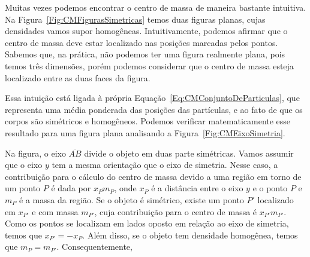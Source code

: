 Muitas vezes podemos encontrar o centro de massa de maneira bastante intuitiva. Na Figura~\ref{Fig:CMFigurasSimetricas} temos duas figuras planas, cujas densidades vamos supor homogêneas. Intuitivamente, podemos afirmar que o centro de massa deve estar localizado nas posições marcadas pelos pontos. Sabemos que, na prática, não podemos ter uma figura realmente plana, pois temos três dimensões, porém podemos considerar que o centro de massa esteja localizado entre as duas faces da figura.

Essa intuição está ligada à própria Equação~\eqref{Eq:CMConjuntoDeParticulas}, que representa uma média ponderada das posições das partículas, e ao fato de que os corpos são simétricos e homogêneos. Podemos verificar matematicamente esse resultado para uma figura plana analisando a Figura~\ref{Fig:CMEixoSimetria}.

Na figura, o eixo $\overline{AB}$ divide o objeto em duas parte simétricas. Vamos assumir que o eixo $y$ tem a mesma orientação que o eixo de simetria. Nesse caso, a contribuição para o cálculo do centro de massa devido a uma região em torno de um ponto $P$ é dada por $x_P m_P$, onde $x_P$ é a distância entre o eixo $y$ e o ponto $P$ e $m_P$ é a massa da região. Se o objeto é simétrico, existe um ponto $P'$ localizado em $x_{P'}$ e com massa $m_{P'}$, cuja contribuição para o centro de massa é $x_{P'}m_{P'}$. Como os pontos se localizam em lados oposto em relação ao eixo de simetria, temos que $x_{P'} = - x_P$. Além disso, se o objeto tem densidade homogênea, temos que $m_P = m_{P'}$. Consequentemente,
%

